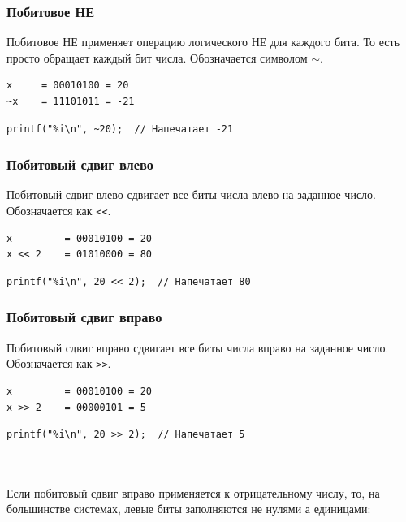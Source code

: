 \documentclass[10pt]{article}
\begin{document}
\subsubsection*{Побитовое НЕ}
Побитовое НЕ применяет операцию логического НЕ для каждого бита. То есть просто обращает каждый бит числа. Обозначается символом $\sim$.\\

\begin{minipage}{0.35\textwidth}
\begin{verbatim}
x     = 00010100 = 20
~x    = 11101011 = -21
\end{verbatim}
\end{minipage}
\hfill
\begin{minipage}{0.55\textwidth}
\begin{lstlisting}
printf("%i\n", ~20);  // Напечатает -21
\end{lstlisting}
\end{minipage}

\subsubsection*{Побитовый сдвиг влево}
Побитовый сдвиг влево сдвигает все биты числа влево на заданное число. Обозначается как \texttt{<{}<}.\\

\begin{minipage}{0.35\textwidth}
\begin{verbatim}
x         = 00010100 = 20
x << 2    = 01010000 = 80
\end{verbatim}
\end{minipage}
\hfill
\begin{minipage}{0.55\textwidth}
\begin{lstlisting}
printf("%i\n", 20 << 2);  // Напечатает 80
\end{lstlisting}
\end{minipage}
\subsubsection*{Побитовый сдвиг вправо}
Побитовый сдвиг вправо сдвигает все биты числа вправо на заданное число. Обозначается как \texttt{>{}>}.\\

\begin{minipage}{0.35\textwidth}
\begin{verbatim}
x         = 00010100 = 20
x >> 2    = 00000101 = 5
\end{verbatim}
\end{minipage}
\hfill
\begin{minipage}{0.55\textwidth}
\begin{lstlisting}
printf("%i\n", 20 >> 2);  // Напечатает 5
\end{lstlisting}
\end{minipage}\\
\quad
\quad\\
Если побитовый сдвиг вправо применяется к отрицательному числу, то, на большинстве системах, левые биты заполняются не нулями а единицами:\\
\end{document}

